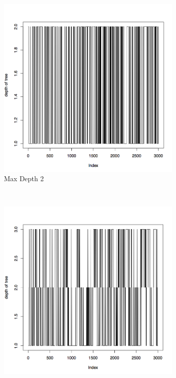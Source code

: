 \documentclass{article}
\begin{document}
\begin{figure}[H]
        \centering
        \begin{subfigure}[b]{0.3\textwidth}
                \centering
                \includegraphics[width=\textwidth]{depth_c2}
                \caption{Max Depth 2}
                \label{fig:gull}
        \end{subfigure}%
        ~ %
        \begin{subfigure}[b]{0.3\textwidth}
                \centering
                \includegraphics[width=\textwidth]{depth_c3}

\end{subfigure}
\end{figure}
\end{document}

